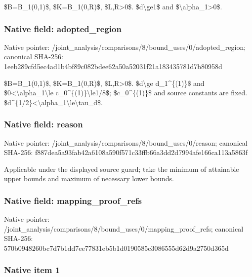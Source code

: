 \documentclass[10pt,a4paper]{article}
\begin{document}
\$B=B\_1(0,1)\$, \$K=B\_1(0,R)\$, \$L,R>0\$. \$d\textbackslash{}ge1\$ and \$\textbackslash{}alpha\_1>0\$.


\subsubsection{Native field: adopted\_region}


Native pointer: /joint\_analysis/comparis\allowbreak{}ons/8/bound\_uses/0/adopt\allowbreak{}ed\_region; canonical SHA-256: 1eeb289cfd5ec4ad1b4bf89c\allowbreak{}082bdee62a50a52031f21a18\allowbreak{}3435781d7b80958d


\$B=B\_1(0,1)\$, \$K=B\_1(0,R)\$, \$L,R>0\$. \$d\textbackslash{}ge d\_1\textasciicircum{}\{(1)\}\$ and \$0<\textbackslash{}alpha\_1\textbackslash{}le c\_0\textasciicircum{}\{(1)\}\textbackslash{}le1/8\$; \$c\_0\textasciicircum{}\{(1)\}\$ and source constants are fixed. \$d\textasciicircum{}\{1/2\}<\textbackslash{}alpha\_1\textbackslash{}le\textbackslash{}tau\_d\$.


\subsubsection{Native field: reason}


Native pointer: /joint\_analysis/comparis\allowbreak{}ons/8/bound\_uses/0/reaso\allowbreak{}n; canonical SHA-256: f887dea5a93fab42a6108a59\allowbreak{}0f571c33ffb66a3dd2d7994a\allowbreak{}fe166ca113a5863f


Applicable under the displayed source guard; take the minimum of attainable upper bounds and maximum of necessary lower bounds.


\subsubsection{Native field: mapping\_proof\_refs}


Native pointer: /joint\_analysis/comparis\allowbreak{}ons/8/bound\_uses/0/mappi\allowbreak{}ng\_proof\_refs; canonical SHA-256: 570b0948260bc7d7b1dd7ee7\allowbreak{}7831eb5b1d0190585c308655\allowbreak{}5d62d9a2750d365d



\subsubsection{Native item 1}
\end{document}
